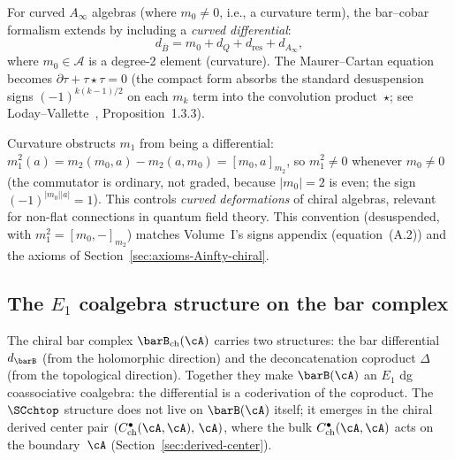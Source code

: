\begin{remark}
For curved $A_\infty$ algebras (where $m_0 \neq 0$, i.e., a curvature term), the bar--cobar formalism extends by including a \emph{curved differential}:
\begin{equation}
d_{\overline{B}} = m_0 + d_Q + d_{\text{res}} + d_{A_\infty},
\end{equation}
where $m_0 \in \mathcal{A}$ is a degree-2 element (curvature). The Maurer--Cartan equation becomes $\partial\tau + \tau\star\tau = 0$ (the compact form absorbs the standard desuspension signs $(-1)^{k(k-1)/2}$ on each $m_k$ term into the convolution product~$\star$; see Loday--Vallette~\cite{LV12}, Proposition~1.3.3).

Curvature obstructs $m_1$ from being a differential:
$m_1^2(a) = m_2(m_0, a) - m_2(a, m_0) = [m_0, a]_{m_2}$,
so $m_1^2 \neq 0$ whenever $m_0 \neq 0$ (the commutator is ordinary, not graded, because $|m_0| = 2$ is even; the sign $(-1)^{|m_0||a|} = 1$).
This controls \emph{curved deformations} of chiral algebras, relevant for non-flat connections in quantum field theory.
This convention (desuspended, with $m_1^2 = [m_0, -]_{m_2}$) matches Volume~I's signs appendix (equation~(A.2)) and the axioms of Section~\ref{sec:axioms-Ainfty-chiral}.
\end{remark}

\subsection{The $E_1$ coalgebra structure on the bar complex}
\label{subsec:bar-swiss-cheese}

The chiral bar complex $\barB_{\mathrm{ch}}(\cA)$ carries two structures: the bar differential $d_{\barB}$ (from the holomorphic direction) and the deconcatenation coproduct $\Delta$ (from the topological direction). Together they make $\barB(\cA)$ an $E_1$ dg coassociative coalgebra: the differential is a coderivation of the coproduct. The $\SCchtop$ structure does not live on $\barB(\cA)$ itself; it emerges in the chiral derived center pair $(C^\bullet_{\mathrm{ch}}(\cA,\cA),\, \cA)$, where the bulk $C^\bullet_{\mathrm{ch}}(\cA,\cA)$ acts on the boundary~$\cA$ (Section~\ref{sec:derived-center}).


